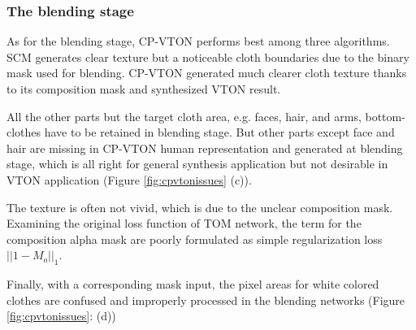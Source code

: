 \subsubsection{The blending stage}      
      
As for the blending stage, CP-VTON performs best among three algorithms. SCM generates clear texture but a noticeable cloth boundaries due to the binary mask used for blending. CP-VTON generated much clearer cloth texture thanks to its composition mask and synthesized VTON result.

All the other parts but the target cloth area, e.g. faces, hair, and arms, bottom-clothes have to be retained in blending stage. But other parts except face and hair are missing in CP-VTON\cite{Wang2018TowardCI} human representation and generated at blending stage, which is all right for general synthesis application but not desirable in VTON application (Figure \ref{fig:cpvtonissues} (c)). 


The texture is often not vivid, which is due to the unclear composition mask. Examining the original loss function of TOM network, the term for the composition alpha mask are poorly formulated as simple regularization loss $|| 1 - M_{o} ||_1$.   

%


Finally, with a corresponding mask input, the pixel areas for white colored clothes are confused and improperly processed in the blending networks (Figure \ref{fig:cpvtonissues}: (d))



